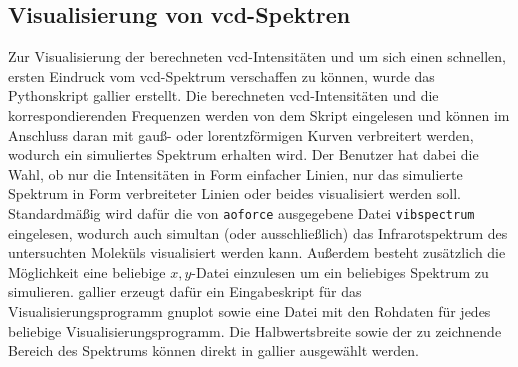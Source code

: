 	\subsection{Visualisierung von \acs{vcd}-Spektren}
	Zur Visualisierung der berechneten \ac{vcd}-Intensitäten und um sich einen schnellen, ersten Eindruck vom \ac{vcd}-Spektrum verschaffen zu können, wurde das Pythonskript \ac{gallier} erstellt. Die berechneten \ac{vcd}-Intensitäten und die korrespondierenden Frequenzen werden von dem Skript eingelesen und können im Anschluss daran mit gauß- oder lorentzförmigen Kurven verbreitert werden, wodurch ein simuliertes Spektrum erhalten wird. Der Benutzer hat dabei die Wahl, ob nur die Intensitäten in Form einfacher Linien, nur das simulierte Spektrum in Form verbreiteter Linien oder beides visualisiert werden soll. Standardmäßig wird dafür die von \texttt{aoforce} ausgegebene Datei \texttt{vibspectrum} eingelesen, wodurch auch simultan (oder ausschließlich) das Infrarotspektrum des untersuchten Moleküls visualisiert werden kann. Außerdem besteht zusätzlich die Möglichkeit eine beliebige $x,y$-Datei einzulesen um ein beliebiges Spektrum zu simulieren. \ac{gallier} erzeugt dafür ein Eingabeskript für das Visualisierungsprogramm gnuplot\supercite{gnuplot} sowie eine Datei mit den Rohdaten für jedes beliebige Visualisierungsprogramm. Die Halbwertsbreite sowie der zu zeichnende Bereich des Spektrums können direkt in \ac{gallier} ausgewählt werden.
	
	
